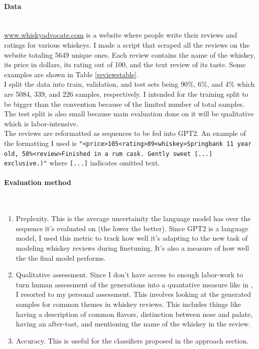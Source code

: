 \documentclass{article}
\begin{document}
\paragraph{Data}$ $
\\ \href{www.whiskyadvocate.com}{www.whiskyadvocate.com} is a website where people write their reviews and ratings for various whiskeys. I made a script that scraped all the reviews on the website totaling 5649 unique ones. Each review contains the name of the whiskey, its price in dollars, its rating out of 100, and the text review of its taste.  Some examples are shown in Table \ref{reviewstable}. 
\\ I split the data into train, validation, and test sets being 90\%, 6\%, and 4\% which are 5084, 339, and 226 samples, respectively. I intended for the training split to be bigger than the convention because of the limited number of total samples. The test split is also small because main evaluation done on it will be qualitative which is labor-intensive. 
\\ The reviews are reformatted as sequences to be fed into GPT2. An example of the formatting I used is \texttt{"<price>105<rating>89<whiskey>Springbank 11 year old, 58\%<review>Finished in a rum cask. Gently sweet [...] exclusive.)"} where \texttt{[...]} indicates omitted text.

\paragraph{Evaluation method}$ $
\begin{enumerate}
\item Preplexity. This is the average uncertainity the language model has over the sequence it's evaluated on (the lower the better). Since GPT2 is a language model, I used this metric to track how well it's adapting to the new task of modeling whiskey reviews during finetuning. It's also a measure of how well the the final model performs.
\item Qualitative assessment. Since I don't have access to enough labor-work to turn human assessment of the generations into a quantative measure like in \cite{adelani2019generating}, I resorted to my personal assessment. This involves looking at the generated samples for common themes in whiskey reviews. This includes things like having a description of common flavors, distinction between nose and palate, having an after-tast, and mentioning the name of the whiskey in the review. 
\item Accuracy. This is useful for the classifiers proposed in the approach section.
\end{enumerate}
\end{document}
